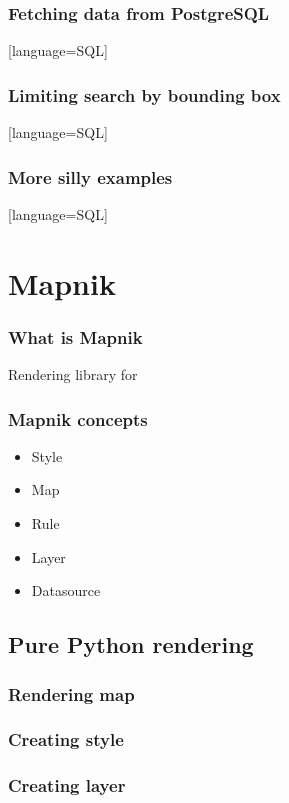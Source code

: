 \documentclass{beamer}
\begin{document}
\begin{frame}
  \frametitle{Fetching data from PostgreSQL}
  [language=SQL]
\end{frame}

\begin{frame}
  \frametitle{Limiting search by bounding box}
  [language=SQL]
\end{frame}

\begin{frame}
  \frametitle{More silly examples}
  [language=SQL]
\end{frame}

\section{Mapnik}

\begin{frame}
  \frametitle{What is Mapnik}
  Rendering library for
\end{frame}

\begin{frame}
  \frametitle{Mapnik concepts}
  \begin{itemize}
  \item Style
  \item Map
  \item Rule
  \item Layer
  \item Datasource
  \end{itemize}
\end{frame}

\subsection{Pure Python rendering}

\begin{frame}
  \frametitle{Rendering map}

\end{frame}


\begin{frame}
  \frametitle{Creating style}

\end{frame}

\begin{frame}
  \frametitle{Creating layer}

\end{frame}
\end{document}
